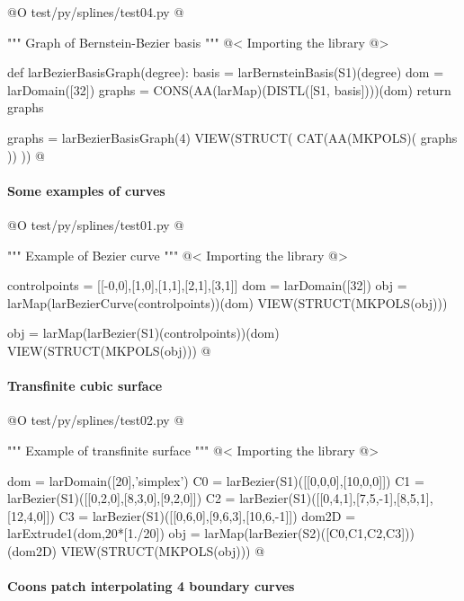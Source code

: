 \documentclass[11pt,oneside]{article}	%
\begin{document}
@O  test/py/splines/test04.py
@{""" Graph of Bernstein-Bezier basis """
@< Importing the library @>

def larBezierBasisGraph(degree):
	basis = larBernsteinBasis(S1)(degree)
	dom = larDomain([32])
	graphs = CONS(AA(larMap)(DISTL([S1, basis])))(dom)
	return graphs

graphs = larBezierBasisGraph(4)
VIEW(STRUCT( CAT(AA(MKPOLS)( graphs )) ))
@}


\paragraph{Some examples of curves}

@O test/py/splines/test01.py 
@{""" Example of Bezier curve """
@< Importing the library @>

controlpoints = [[-0,0],[1,0],[1,1],[2,1],[3,1]]
dom = larDomain([32])
obj = larMap(larBezierCurve(controlpoints))(dom)
VIEW(STRUCT(MKPOLS(obj)))

obj = larMap(larBezier(S1)(controlpoints))(dom)
VIEW(STRUCT(MKPOLS(obj)))
@}

\paragraph{Transfinite cubic surface}

@O test/py/splines/test02.py  
@{""" Example of transfinite surface """
@< Importing the library @>

dom = larDomain([20],'simplex')
C0 = larBezier(S1)([[0,0,0],[10,0,0]])
C1 = larBezier(S1)([[0,2,0],[8,3,0],[9,2,0]])
C2 = larBezier(S1)([[0,4,1],[7,5,-1],[8,5,1],[12,4,0]])
C3 = larBezier(S1)([[0,6,0],[9,6,3],[10,6,-1]])
dom2D = larExtrude1(dom,20*[1./20])
obj = larMap(larBezier(S2)([C0,C1,C2,C3]))(dom2D)
VIEW(STRUCT(MKPOLS(obj)))
@}

\paragraph{Coons patch interpolating 4 boundary curves}
\end{document}
